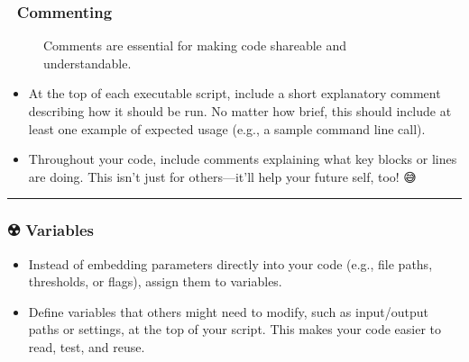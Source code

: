 \documentclass[letterpaper,10pt,english]{jupyterBook}
\let\sphinxpxdimen\pdfpxdimen\else\newdimen\sphinxpxdimen
\begin{document}
\subsubsection{📝 Commenting}
\label{\detokenize{chapters/02/02a_coding-best-practices:commenting}}
\begin{figure}[htbp]
\centering
\capstart

\noindent\sphinxincludegraphics[height=380\sphinxpxdimen]{{code_comments}.jpg}
\caption{Comments are essential for making code shareable and understandable.}\label{\detokenize{chapters/02/02a_coding-best-practices:comment-fig}}\end{figure}
\begin{itemize}
\item {} 
\sphinxAtStartPar
{} At the top of each executable script, include a short explanatory comment describing how it should be run. No matter how brief, this should include at least one example of expected usage (e.g., a sample command line call).

\item {} 
\sphinxAtStartPar
{} Throughout your code, include comments explaining what key blocks or lines are doing. This isn’t just for others—it’ll help your future self, too! 😅

\end{itemize}


\bigskip\hrule\bigskip



\subsubsection{☢️ Variables}
\label{\detokenize{chapters/02/02a_coding-best-practices:variables}}\begin{itemize}
\item {} 
\sphinxAtStartPar
{} Instead of embedding parameters directly into your code (e.g., file paths, thresholds, or flags), assign them to variables.

\item {} 
\sphinxAtStartPar
{} Define variables that others might need to modify, such as input/output paths or settings, at the top of your script. This makes your code easier to read, test, and reuse.

\end{itemize}
\end{document}

